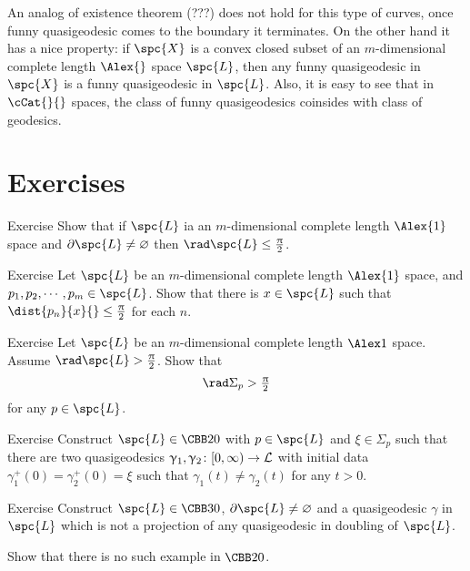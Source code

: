 An analog of existence theorem (???) does not hold for this type of curves,
once funny quasigeodesic comes to the boundary it terminates.
On the other hand it has a nice property: if $\spc{X}$ is a convex closed subset of an $m$-dimensional complete length $\Alex{}$ space $\spc{L}$, then any funny quasigeodesic in $\spc{X}$ is a funny quasigeodesic in $\spc{L}$.
Also, it is easy to see that in $\cCat{}{}$ spaces, 
the class of funny quasigeodesics coinsides with class of geodesics.








\section{Exercises}

\begin{thm}{Exercise} Show that if $\spc{L}$ ia an $m$-dimensional complete length $\Alex{1}$ space and $\partial \spc{L}\not=\emptyset$ then $\rad \spc{L}\le\tfrac\pi2$.
\end{thm}


\begin{thm}{Exercise}
Let $\spc{L}$ be an $m$-dimensional complete length $\Alex{1}$ space, and $p_1,p_2,\cdots,p_m\in \spc{L}$. 
Show that there is $x\in \spc{L}$ such that $\dist{p_n}{x}{}\le\frac\pi2$ for each $n$.
\end{thm}

\begin{thm}{Exercise}
Let $\spc{L}$ be an $m$-dimensional complete length $\Alex1$ space.
Assume $\rad\spc{L}>\tfrac\pi2$.
Show that 
\[\rad\Sigma_p>\tfrac\pi2\]
for any $p\in \spc{L}$.
\end{thm}

\begin{thm}{Exercise} Construct $\spc{L}\in\CBB 2 0$ with $p\in \spc{L}$ and $\xi\in \Sigma_p$ such that there are two quasigeodesics $\gamma_1,\gamma_2\:[0,\infty)\to \spc{L}$ with initial data $\gamma_1^+(0)=\gamma_2^+(0)=\xi$ such that $\gamma_1(t)\not=\gamma_2(t)$ for any $t>0$.
\end{thm}

\begin{thm}{Exercise} Construct $\spc{L}\in \CBB 3 0$, 
$\partial \spc{L}\not=\emptyset$ and a quasigeodesic $\gamma$ in $\spc{L}$ which is not a projection of any quasigeodesic in doubling of $\spc{L}$.

Show that there is no such example in $\CBB20$.
\end{thm}
